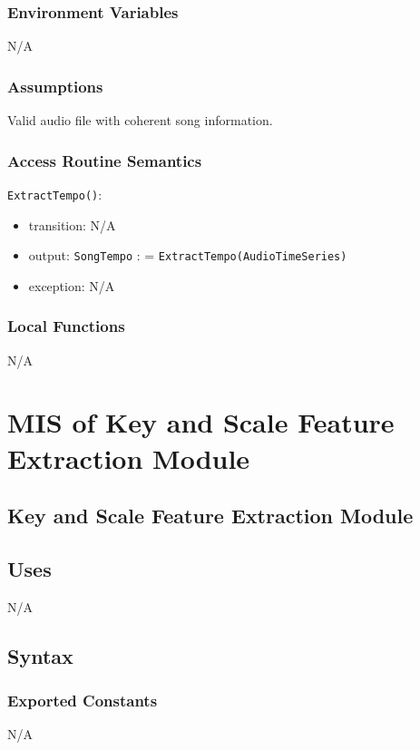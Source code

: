 \documentclass[12pt, titlepage]{article}
\begin{document}
\subsubsection{Environment Variables}
N/A

\subsubsection{Assumptions}
Valid audio file with coherent song information.

\subsubsection{Access Routine Semantics}

\noindent \texttt{ExtractTempo()}:
\begin{itemize}
\item transition: N/A
\item output: \texttt{Song\textunderscore Tempo} : = \texttt{ExtractTempo(Audio\textunderscore Time\textunderscore Series)}
\item exception: N/A
\end{itemize}

\subsubsection{Local Functions}
N/A



\section{MIS of Key and Scale Feature Extraction Module} 

\subsection{Key and Scale Feature Extraction Module}

\subsection{Uses}
N/A

\subsection{Syntax}

\subsubsection{Exported Constants}
N/A
\end{document}
